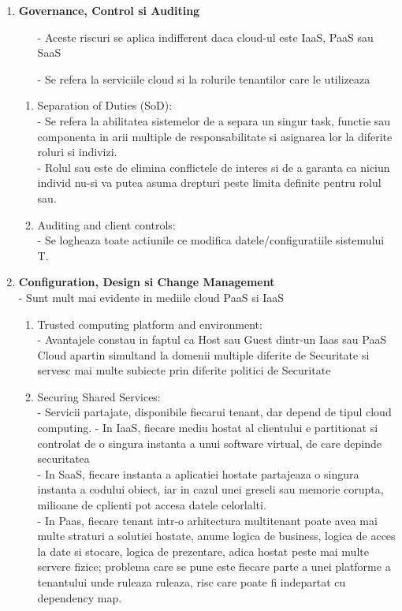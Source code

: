 \documentclass[twoside,twocolumn]{article}
\begin{document}
\begin{enumerate}
\item	\textbf{Governance, Control si Auditing }
\begin{itemize}
\item [-] Aceste riscuri se aplica indifferent daca cloud-ul este IaaS, PaaS sau SaaS 
\item [-] Se refera la serviciile cloud si la rolurile tenantilor care le utilizeaza\\
\end{itemize}
\begin{enumerate}
\item	Separation of Duties (SoD): \\
- Se refera la abilitatea sistemelor de a separa un singur task, functie sau componenta in arii multiple de responsabilitate si asignarea lor la diferite roluri si indivizi.\\
- Rolul sau este de elimina conflictele de interes si de a garanta ca niciun individ nu-si va putea asuma drepturi peste limita definite pentru rolul sau.\\

\item Auditing and client controls:\\
-	Se logheaza toate actiunile ce modifica datele/configuratiile sistemului T.
\end{enumerate}

\item \textbf{Configuration, Design si Change Management}\\
- Sunt mult mai evidente in mediile cloud PaaS si IaaS \\

\begin{enumerate}
\item	Trusted computing platform and environment: \\
- Avantajele constau in faptul ca Host sau Guest dintr-un Iaas sau PaaS Cloud apartin simultand la domenii multiple diferite de Securitate si servesc mai multe subiecte prin diferite politici de Securitate\\

\item Securing Shared Services:\\
- Servicii partajate, disponibile fiecarui tenant, dar depend de tipul cloud computing.
- In IaaS, fiecare mediu hostat al clientului e partitionat si controlat de o singura instanta a unui software virtual, de care depinde securitatea\\
- In SaaS, fiecare instanta a aplicatiei hostate partajeaza o singura instanta a codului obiect, iar in cazul unei greseli sau memorie corupta, milioane de cplienti pot accesa datele celorlalti.\\
- In Paas,  fiecare tenant intr-o arhitectura multitenant poate avea mai multe straturi a solutiei hostate, anume logica de business, logica de acces la date si stocare, logica de prezentare, adica hostat peste mai multe servere fizice; problema care se pune este fiecare parte a unei platforme a tenantului unde ruleaza ruleaza, risc care poate fi indepartat cu dependency map.\\


\end{enumerate}
\end{enumerate}
\end{document}

